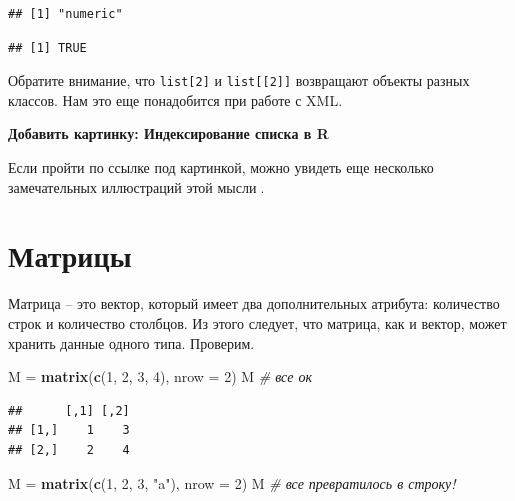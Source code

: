 \documentclass[
]{book}
\newenvironment{Shaded}{\begin{snugshade}}{\end{snugshade}}
\newcommand{\AttributeTok}[1]{\textcolor[rgb]{0.13,0.29,0.53}{#1}}
\newcommand{\CommentTok}[1]{\textcolor[rgb]{0.56,0.35,0.01}{\textit{#1}}}
\newcommand{\DecValTok}[1]{\textcolor[rgb]{0.00,0.00,0.81}{#1}}
\newcommand{\FunctionTok}[1]{\textcolor[rgb]{0.13,0.29,0.53}{\textbf{#1}}}
\newcommand{\NormalTok}[1]{#1}
\newcommand{\OtherTok}[1]{\textcolor[rgb]{0.56,0.35,0.01}{#1}}
\newcommand{\SpecialCharTok}[1]{\textcolor[rgb]{0.81,0.36,0.00}{\textbf{#1}}}
\newcommand{\StringTok}[1]{\textcolor[rgb]{0.31,0.60,0.02}{#1}}
\theoremstyle{definition}
\theoremstyle{definition}
\theoremstyle{definition}
\theoremstyle{definition}
\theoremstyle{remark}
\begin{document}
\begin{verbatim}
## [1] "numeric"
\end{verbatim}

\begin{Shaded}
\end{Shaded}

\begin{verbatim}
## [1] TRUE
\end{verbatim}

Обратите внимание, что \texttt{list{[}2{]}} и \texttt{list{[}{[}2{]}{]}} возвращают объекты разных классов. Нам это еще понадобится при работе с XML.

\textbf{Добавить картинку: Индексирование списка в R}

Если пройти по ссылке под картинкой, можно увидеть еще несколько замечательных иллюстраций этой мысли🧂.

\hypertarget{ux43cux430ux442ux440ux438ux446ux44b}{%
\section{Матрицы}\label{ux43cux430ux442ux440ux438ux446ux44b}}

Матрица -- это вектор, который имеет два дополнительных атрибута: количество строк и количество столбцов. Из этого следует, что матрица, как и вектор, может хранить данные одного типа. Проверим.

\begin{Shaded}
\begin{Highlighting}[]
\NormalTok{M }\OtherTok{=} \FunctionTok{matrix}\NormalTok{(}\FunctionTok{c}\NormalTok{(}\DecValTok{1}\NormalTok{, }\DecValTok{2}\NormalTok{, }\DecValTok{3}\NormalTok{, }\DecValTok{4}\NormalTok{), }\AttributeTok{nrow =} \DecValTok{2}\NormalTok{)}
\NormalTok{M }\CommentTok{\# все ок}
\end{Highlighting}
\end{Shaded}

\begin{verbatim}
##      [,1] [,2]
## [1,]    1    3
## [2,]    2    4
\end{verbatim}

\begin{Shaded}
\begin{Highlighting}[]
\NormalTok{M }\OtherTok{=} \FunctionTok{matrix}\NormalTok{(}\FunctionTok{c}\NormalTok{(}\DecValTok{1}\NormalTok{, }\DecValTok{2}\NormalTok{, }\DecValTok{3}\NormalTok{, }\StringTok{"a"}\NormalTok{), }\AttributeTok{nrow =} \DecValTok{2}\NormalTok{)}
\NormalTok{M }\CommentTok{\# все превратилось в строку! }
\end{Highlighting}
\end{Shaded}
\end{document}
